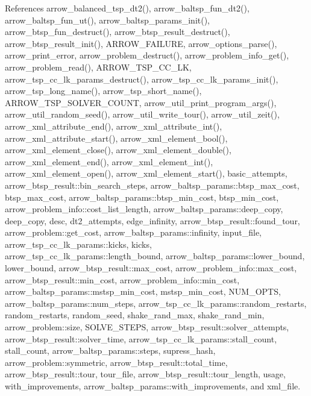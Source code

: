References arrow\_\-balanced\_\-tsp\_\-dt2(), arrow\_\-baltsp\_\-fun\_\-dt2(), arrow\_\-baltsp\_\-fun\_\-ut(), arrow\_\-baltsp\_\-params\_\-init(), arrow\_\-btsp\_\-fun\_\-destruct(), arrow\_\-btsp\_\-result\_\-destruct(), arrow\_\-btsp\_\-result\_\-init(), ARROW\_\-FAILURE, arrow\_\-options\_\-parse(), arrow\_\-print\_\-error, arrow\_\-problem\_\-destruct(), arrow\_\-problem\_\-info\_\-get(), arrow\_\-problem\_\-read(), ARROW\_\-TSP\_\-CC\_\-LK, arrow\_\-tsp\_\-cc\_\-lk\_\-params\_\-destruct(), arrow\_\-tsp\_\-cc\_\-lk\_\-params\_\-init(), arrow\_\-tsp\_\-long\_\-name(), arrow\_\-tsp\_\-short\_\-name(), ARROW\_\-TSP\_\-SOLVER\_\-COUNT, arrow\_\-util\_\-print\_\-program\_\-args(), arrow\_\-util\_\-random\_\-seed(), arrow\_\-util\_\-write\_\-tour(), arrow\_\-util\_\-zeit(), arrow\_\-xml\_\-attribute\_\-end(), arrow\_\-xml\_\-attribute\_\-int(), arrow\_\-xml\_\-attribute\_\-start(), arrow\_\-xml\_\-element\_\-bool(), arrow\_\-xml\_\-element\_\-close(), arrow\_\-xml\_\-element\_\-double(), arrow\_\-xml\_\-element\_\-end(), arrow\_\-xml\_\-element\_\-int(), arrow\_\-xml\_\-element\_\-open(), arrow\_\-xml\_\-element\_\-start(), basic\_\-attempts, arrow\_\-btsp\_\-result::bin\_\-search\_\-steps, arrow\_\-baltsp\_\-params::btsp\_\-max\_\-cost, btsp\_\-max\_\-cost, arrow\_\-baltsp\_\-params::btsp\_\-min\_\-cost, btsp\_\-min\_\-cost, arrow\_\-problem\_\-info::cost\_\-list\_\-length, arrow\_\-baltsp\_\-params::deep\_\-copy, deep\_\-copy, desc, dt2\_\-attempts, edge\_\-infinity, arrow\_\-btsp\_\-result::found\_\-tour, arrow\_\-problem::get\_\-cost, arrow\_\-baltsp\_\-params::infinity, input\_\-file, arrow\_\-tsp\_\-cc\_\-lk\_\-params::kicks, kicks, arrow\_\-tsp\_\-cc\_\-lk\_\-params::length\_\-bound, arrow\_\-baltsp\_\-params::lower\_\-bound, lower\_\-bound, arrow\_\-btsp\_\-result::max\_\-cost, arrow\_\-problem\_\-info::max\_\-cost, arrow\_\-btsp\_\-result::min\_\-cost, arrow\_\-problem\_\-info::min\_\-cost, arrow\_\-baltsp\_\-params::mstsp\_\-min\_\-cost, mstsp\_\-min\_\-cost, NUM\_\-OPTS, arrow\_\-baltsp\_\-params::num\_\-steps, arrow\_\-tsp\_\-cc\_\-lk\_\-params::random\_\-restarts, random\_\-restarts, random\_\-seed, shake\_\-rand\_\-max, shake\_\-rand\_\-min, arrow\_\-problem::size, SOLVE\_\-STEPS, arrow\_\-btsp\_\-result::solver\_\-attempts, arrow\_\-btsp\_\-result::solver\_\-time, arrow\_\-tsp\_\-cc\_\-lk\_\-params::stall\_\-count, stall\_\-count, arrow\_\-baltsp\_\-params::steps, supress\_\-hash, arrow\_\-problem::symmetric, arrow\_\-btsp\_\-result::total\_\-time, arrow\_\-btsp\_\-result::tour, tour\_\-file, arrow\_\-btsp\_\-result::tour\_\-length, usage, with\_\-improvements, arrow\_\-baltsp\_\-params::with\_\-improvements, and xml\_\-file.

